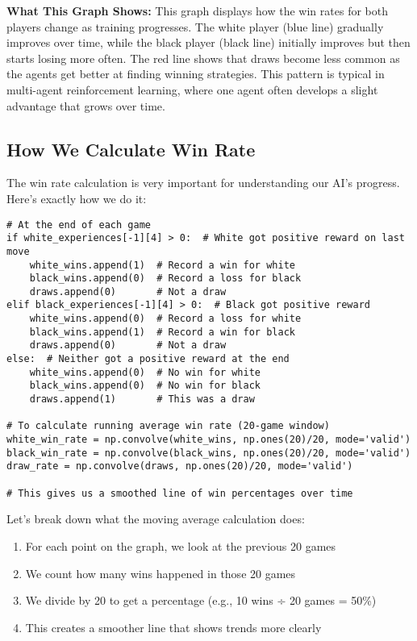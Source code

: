 \documentclass[11pt]{article}
\begin{document}
\textbf{What This Graph Shows:} This graph displays how the win rates for both players change as training progresses. The white player (blue line) gradually improves over time, while the black player (black line) initially improves but then starts losing more often. The red line shows that draws become less common as the agents get better at finding winning strategies. This pattern is typical in multi-agent reinforcement learning, where one agent often develops a slight advantage that grows over time.

\subsection{How We Calculate Win Rate}

The win rate calculation is very important for understanding our AI's progress. Here's exactly how we do it:

\begin{tcolorbox}[colback=yellow!5!white,colframe=yellow!75!black,title=Calculating Win Rates]
\begin{lstlisting}[style=Python]
# At the end of each game
if white_experiences[-1][4] > 0:  # White got positive reward on last move
    white_wins.append(1)  # Record a win for white
    black_wins.append(0)  # Record a loss for black
    draws.append(0)       # Not a draw
elif black_experiences[-1][4] > 0:  # Black got positive reward
    white_wins.append(0)  # Record a loss for white
    black_wins.append(1)  # Record a win for black
    draws.append(0)       # Not a draw
else:  # Neither got a positive reward at the end
    white_wins.append(0)  # No win for white
    black_wins.append(0)  # No win for black
    draws.append(1)       # This was a draw

# To calculate running average win rate (20-game window)
white_win_rate = np.convolve(white_wins, np.ones(20)/20, mode='valid')
black_win_rate = np.convolve(black_wins, np.ones(20)/20, mode='valid')
draw_rate = np.convolve(draws, np.ones(20)/20, mode='valid')

# This gives us a smoothed line of win percentages over time
\end{lstlisting}
\end{tcolorbox}

Let's break down what the moving average calculation does:

\begin{enumerate}
    \item For each point on the graph, we look at the previous 20 games
    \item We count how many wins happened in those 20 games
    \item We divide by 20 to get a percentage (e.g., 10 wins ÷ 20 games = 50\%)
    \item This creates a smoother line that shows trends more clearly
\end{enumerate}
\end{document}
